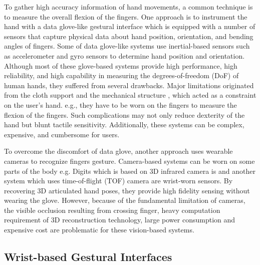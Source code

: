 \documentclass{sigchi}
\begin{document}
To gather high accuracy information of hand movements, a common technique is to measure the overall flexion of the fingers. One approach is to instrument the hand with a data glove-like gestural interface \cite{4539650} which is equipped with a number of sensors that capture physical data about hand position, orientation, and bending angles of fingers. Some of data glove-like systems use inertial-based sensors such as accelerometer and gyro sensors to determine hand position and orientation.%
Although most of these glove-based systems provide high performance, high reliability, and high capability in measuring the degrees-of-freedom (DoF) of human hands, they suffered from several drawbacks.%
Major limitations originated from the cloth support and the mechanical structure%
, which acted as a constraint on the user’s hand. e.g., they have to be worn on the fingers to measure the flexion of the fingers. Such complications may not only reduce dexterity of the hand but blunt tactile sensitivity. Additionally, these systems can be complex, expensive, and cumbersome for users.

To overcome the discomfort of data glove, another approach uses wearable cameras to recognize fingers gesture. Camera-based systems can be worn on some parts of the body e.g. Digits \cite{Kim:2012:DFI:2380116.2380139} which is based on 3D infrared camera is and another system \cite{6855631} which uses time-of-flight (TOF) camera are wrist-worn sensors. By recovering 3D articulated hand poses, they provide high fidelity sensing without wearing the glove. However, because of the fundamental limitation of cameras, the visible occlusion resulting from crossing finger, heavy computation requirement of 3D reconstruction technology, large power consumption and expensive cost are problematic for these vision-based systems.

\subsection{Wrist-based Gestural Interfaces}

\end{document}
